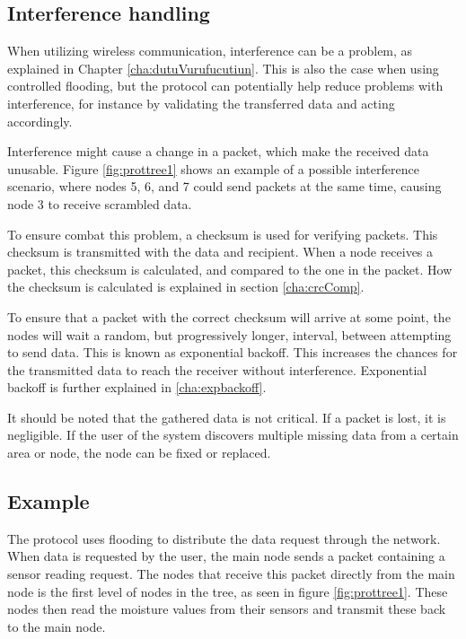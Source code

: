 \subsection{Interference handling} \label{cha:crcDesign}
When utilizing wireless communication, interference can be a problem, as explained in Chapter \ref{cha:dutuVurufucutiun}. This is also the case when using controlled flooding, but the protocol can potentially help reduce problems with interference, for instance by validating the transferred data and acting accordingly.

Interference might cause a change in a packet, which make the received data unusable. Figure \ref{fig:prottree1} shows an example of a possible interference scenario, where nodes 5, 6, and 7 could send packets at the same time, causing node 3 to receive scrambled data.

To ensure combat this problem, a checksum is used for verifying packets. This checksum is transmitted with the data and recipient. When a node receives a packet, this checksum is calculated, and compared to the one in the packet. How the checksum is calculated is explained in section \ref{cha:crcComp}.

To ensure that a packet with the correct checksum will arrive at some point, the nodes will wait a random, but progressively longer, interval, between attempting to send data. This is known as exponential backoff. This increases the chances for the transmitted data to reach the receiver without interference. Exponential backoff is further explained in \ref{cha:expbackoff}.

It should be noted that the gathered data is not critical. If a packet is lost, it is negligible. If the user of the system discovers multiple missing data from a certain area or node, the node can be fixed or replaced.


\subsection*{Example}
The protocol uses flooding to distribute the data request through the network. 
When data is requested by the user, the main node sends a packet containing a sensor reading request. 
The nodes that receive this packet directly from the main node is the first level of nodes in the tree, as seen in figure \ref{fig:prottree1}. 
These nodes then read the moisture values from their sensors and transmit these back to the main node. 

